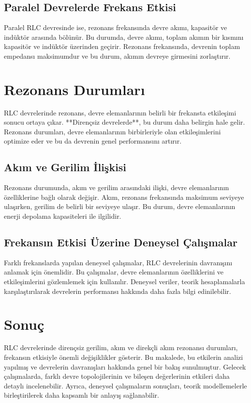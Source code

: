 \documentclass[11pt,letterpaper,twocolumn]{fenbil}
\begin{document}
\subsection{Paralel Devrelerde Frekans Etkisi}
Paralel RLC devresinde ise, rezonans frekansında devre akımı, kapasitör ve indüktör arasında bölünür. Bu durumda, devre akımı, toplam akımın bir kısmını kapasitör ve indüktör üzerinden geçirir. Rezonans frekansında, devrenin toplam empedansı maksimumdur ve bu durum, akımın devreye girmesini zorlaştırır.

\section{Rezonans Durumları}
RLC devrelerinde rezonans, devre elemanlarının belirli bir frekansta etkileşimi sonucu ortaya çıkar. **Dirençsiz devrelerde**, bu durum daha belirgin hale gelir. Rezonans durumları, devre elemanlarının birbirleriyle olan etkileşimlerini optimize eder ve bu da devrenin genel performansını artırır.

\subsection{Akım ve Gerilim İlişkisi}
Rezonans durumunda, akım ve gerilim arasındaki ilişki, devre elemanlarının özelliklerine bağlı olarak değişir. Akım, rezonans frekansında maksimum seviyeye ulaşırken, gerilim de belirli bir seviyeye ulaşır. Bu durum, devre elemanlarının enerji depolama kapasiteleri ile ilgilidir.

\subsection{Frekansın Etkisi Üzerine Deneysel Çalışmalar}
Farklı frekanslarda yapılan deneysel çalışmalar, RLC devrelerinin davranışını anlamak için önemlidir. Bu çalışmalar, devre elemanlarının özelliklerini ve etkileşimlerini gözlemlemek için kullanılır. Deneysel veriler, teorik hesaplamalarla karşılaştırılarak devrelerin performansı hakkında daha fazla bilgi edinilebilir.

\section{Sonuç}
RLC devrelerinde dirençsiz gerilim, akım ve direkçli akım rezonansı durumları, frekansın etkisiyle önemli değişiklikler gösterir. Bu makalede, bu etkilerin analizi yapılmış ve devrelerin davranışları hakkında genel bir bakış sunulmuştur. Gelecek çalışmalarda, farklı devre topolojilerinin ve bileşen değerlerinin etkileri daha detaylı incelenebilir. Ayrıca, deneysel çalışmaların sonuçları, teorik modellemelerle birleştirilerek daha kapsamlı bir anlayış sağlanabilir.
\end{document}
